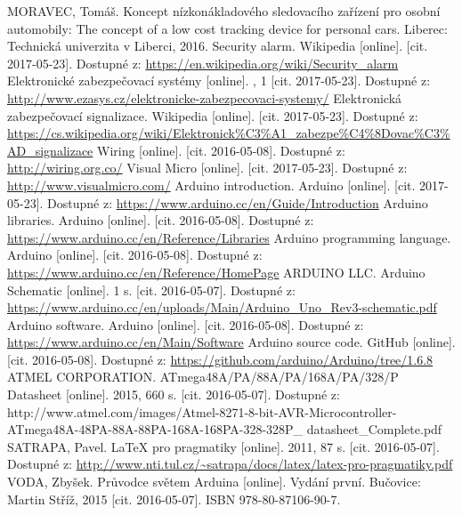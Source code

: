 \documentclass[FM,DP]{tulthesis}  %
\begin{document}
\begin{thebibliography}{10}
MORAVEC, Tomáš. Koncept nízkonákladového sledovacího zařízení pro osobní automobily: The concept of a low cost tracking device for personal cars. Liberec: Technická univerzita v Liberci, 2016.
Security alarm. Wikipedia [online]. [cit. 2017-05-23]. Dostupné z: \url{https://en.wikipedia.org/wiki/Security_alarm}
Elektronické zabezpečovací systémy [online]. , 1 [cit. 2017-05-23]. Dostupné z: \url{http://www.ezasys.cz/elektronicke-zabezpecovaci-systemy/}
Elektronická zabezpečovací signalizace. Wikipedia [online]. [cit. 2017-05-23]. Dostupné z: \url{https://cs.wikipedia.org/wiki/Elektronick\%C3\%A1\_zabezpe\%C4\%8Dovac\%C3\%AD_signalizace}
Wiring [online]. [cit. 2016-05-08]. Dostupné z: \url{http://wiring.org.co/}
Visual Micro [online]. [cit. 2017-05-23]. Dostupné z: \url{http://www.visualmicro.com/}
Arduino introduction. Arduino [online]. [cit. 2017-05-23]. Dostupné z: \url{https://www.arduino.cc/en/Guide/Introduction}
Arduino libraries. Arduino [online]. [cit. 2016-05-08]. Dostupné z: \url{https://www.arduino.cc/en/Reference/Libraries}
Arduino programming language. Arduino [online]. [cit. 2016-05-08]. Dostupné z: \url{https://www.arduino.cc/en/Reference/HomePage}
ARDUINO LLC. Arduino Schematic [online]. 1 s. [cit. 2016-05-07]. Dostupné z: \url{https://www.arduino.cc/en/uploads/Main/Arduino\_Uno\_Rev3-schematic.pdf}
 Arduino software. Arduino [online]. [cit. 2016-05-08]. Dostupné z: \url{https://www.arduino.cc/en/Main/Software}
Arduino source code. GitHub [online]. [cit. 2016-05-08]. Dostupné z: \url{https://github.com/arduino/Arduino/tree/1.6.8}
ATMEL CORPORATION. ATmega48A/PA/88A/PA/168A/PA/328/P Datasheet [online]. 2015, 660 s. [cit. 2016-05-07]. Dostupné z: http://www.atmel.com/images/Atmel-8271-8-bit-AVR-Microcontroller-ATmega48A-48PA-88A-88PA-168A-168PA-328-328P\_ datasheet\_Complete.pdf
SATRAPA, Pavel. LaTeX pro pragmatiky [online]. 2011, 87 s. [cit. 2016-05-07]. Dostupné z: \url{http://www.nti.tul.cz/~satrapa/docs/latex/latex-pro-pragmatiky.pdf}
VODA, Zbyšek. Průvodce světem Arduina [online]. Vydání první. Bučovice: Martin Stříž, 2015 [cit. 2016-05-07]. ISBN 978-80-87106-90-7.

\end{thebibliography}
\end{document}
